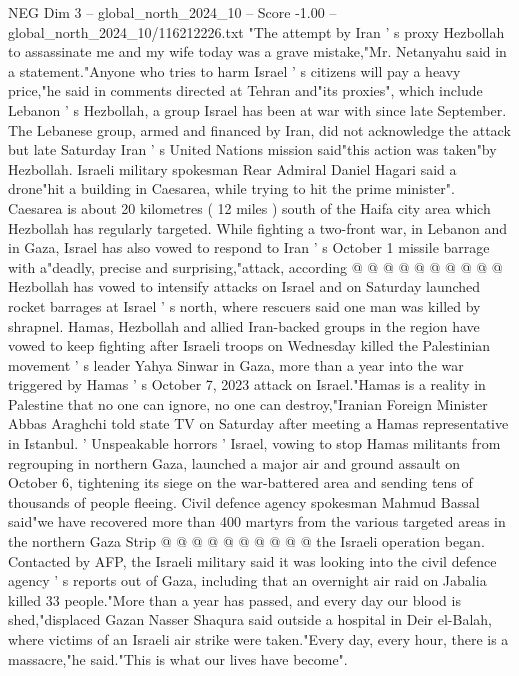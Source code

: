 \begin{textsample}{NEG Dim 3 – global\_north\_2024\_10 – Score -1.00 – global\_north\_2024\_10/116212226.txt}  \label{ex:f3_neg_301}
"The attempt by Iran ' s proxy Hezbollah to assassinate me and my wife today was a grave mistake,"Mr.
Netanyahu said in a statement."Anyone who tries to harm Israel ' s citizens will pay a heavy price,"he said in comments directed at Tehran and"its proxies", which include Lebanon ' s Hezbollah, a group Israel has been at war with since late September.
The Lebanese group, armed and financed by Iran, did not acknowledge the attack but late Saturday Iran ' s United Nations mission said"this action was taken"by Hezbollah.
Israeli military spokesman Rear Admiral Daniel Hagari said a drone"hit a building in Caesarea, while trying to hit the prime minister".
Caesarea is about 20 kilometres ( 12 miles ) south of the Haifa city area which Hezbollah has regularly targeted.
While fighting a two-front war, in Lebanon and in Gaza, Israel has also vowed to respond to Iran ' s October 1 missile barrage with a"deadly, precise and surprising,"attack, according @ @ @ @ @ @ @ @ @ @ Hezbollah has vowed to intensify attacks on Israel and on Saturday launched rocket barrages at Israel ' s north, where rescuers said one man was killed by shrapnel.
Hamas, Hezbollah and allied Iran-backed groups in the region have vowed to keep fighting after Israeli troops on Wednesday killed the Palestinian movement ' s leader Yahya Sinwar in Gaza, more than a year into the war triggered by Hamas ' s October 7, 2023 attack on Israel."Hamas is a reality in Palestine that no one can ignore, no one can destroy,"Iranian Foreign Minister Abbas Araghchi told state TV on Saturday after meeting a Hamas representative in Istanbul. ' Unspeakable horrors ' Israel, vowing to stop Hamas militants from regrouping in northern Gaza, launched a major air and ground assault on October 6, tightening its siege on the war-battered area and sending tens of thousands of people fleeing.
Civil defence agency spokesman Mahmud Bassal said"we have recovered more than 400 martyrs from the various targeted areas in the northern Gaza Strip @ @ @ @ @ @ @ @ @ @ the Israeli operation began.
Contacted by AFP, the Israeli military said it was looking into the civil defence agency ' s reports out of Gaza, including that an overnight air raid on Jabalia killed 33 people."More than a year has passed, and every day our blood is shed,"displaced Gazan Nasser Shaqura said outside a hospital in Deir el-Balah, where victims of an Israeli air strike were taken."Every day, every hour, there is a massacre,"he said."This is what our lives have become".

\end{textsample}
